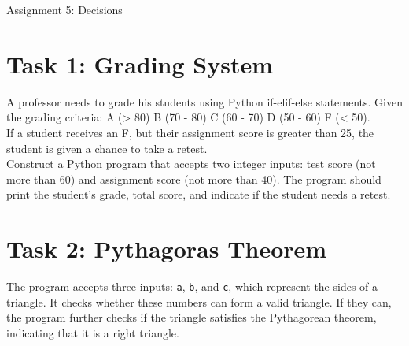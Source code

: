 \documentclass[11pt]{article}
\begin{document}
\begin{center}
    \Large{Assignment 5: Decisions}
\end{center}

\section*{Task 1: Grading System}
A professor needs to grade his students using Python if-elif-else statements.
Given the grading criteria: A (> 80) B (70 - 80) C (60 - 70) D (50 - 60) F (< 50).\\
If a student receives an F, but their assignment score is greater than 25, the student is given a chance to take a retest.\\

\noindent
Construct a Python program that accepts two integer inputs: test score (not more than 60) and assignment score (not more than 40). The program should print the student's grade, total score, and indicate if the student needs a retest.



\begin{tcolorbox}[colback=black!10!white, colframe=black!75!white, title=\textbf{Answer}]
    \vspace{3cm}
\end{tcolorbox}    


\section*{Task 2: Pythagoras Theorem}

The program accepts three inputs: \texttt{a}, \texttt{b}, and \texttt{c}, 
which represent the sides of a triangle. 
It checks whether these numbers can form a valid triangle. 
If they can, the program further checks if the triangle satisfies 
the Pythagorean theorem, indicating that it is a right triangle.

\begin{tcolorbox}[colback=black!10!white, colframe=black!75!white, title=\textbf{Answer}]
    \vspace{3cm}
\end{tcolorbox} 
\end{document}
